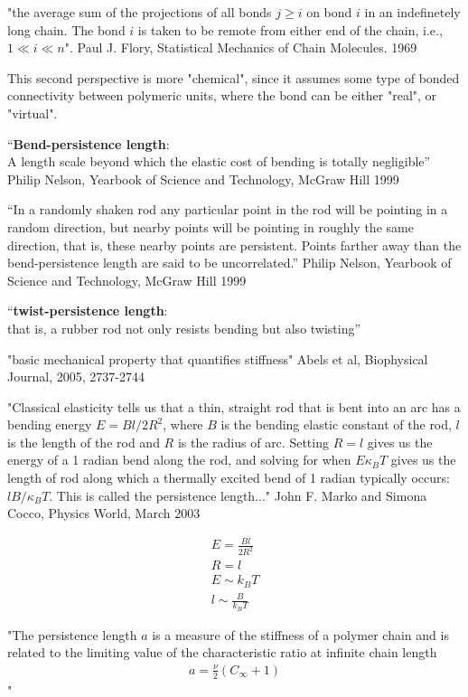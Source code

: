 "the average sum of the projections of all bonds $ j \geq i$  on bond
$i$ in an indefinetely long chain. The bond $i$ is taken to be remote
from either end of the chain, i.e., $1 \ll i \ll n$". Paul J. Flory,
Statistical Mechanics of Chain Molecules. 1969

This second perspective is more "chemical", since it assumes
some type of bonded  connectivity between polymeric units, where the
bond can be either "real", or "virtual".


``\textbf{Bend-persistence length}:\\ 
A length scale beyond which the elastic cost of bending is totally
negligible'' Philip Nelson, Yearbook of Science and Technology, McGraw
Hill 1999

``In a randomly shaken rod any particular point in the rod will be
pointing in a random direction, but nearby points will be pointing in
roughly the same direction, that is, these nearby points are
persistent. Points farther away than the bend-persistence length are
said to be uncorrelated.'' Philip Nelson, Yearbook of Science and
Technology, McGraw Hill 1999

``\textbf{twist-persistence length}:\\
that is, a rubber rod not only resists bending but also twisting''

"basic mechanical property that quantifies stiffness"
Abels et al, Biophysical Journal, 2005, 2737-2744


"Classical elasticity tells us that a thin, straight rod that is bent
into an arc has a bending energy $E=Bl/2R^2$, where $B$ is the bending
elastic constant of the rod, $l$ is the length of the rod and $R$ is
the radius of arc. Setting $R=l$ gives us the energy of a 1 radian
bend along the rod, and solving for when $E \kappa_{B}T$ gives us the
length of rod along which a thermally excited bend of 1 radian
typically occurs: $l B/\kappa_{B}T$. This is called the persistence
length..." John F. Marko and Simona Cocco, Physics World, March 2003



\begin{gather}
E=\frac{Bl}{2R^2}\\
R=l\\
E \sim k_{B}T\\
l \sim \frac{B}{k_{B}T}
\end{gather}  




"The persistence length $a$ is a measure of the stiffness of a polymer
chain and is related to the limiting value of the characteristic ratio
at infinite chain length
\begin{gather}
a=\frac{\nu}{2}(C_{\infty}+1)
\end{gather}
"

